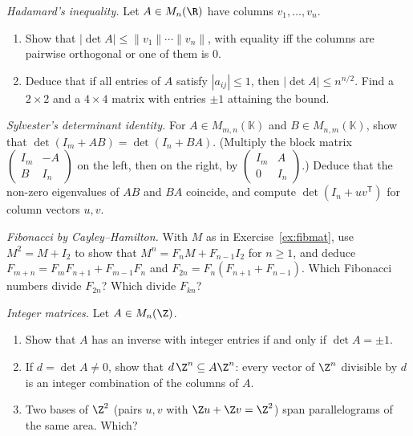 \begin{exercise}[$\star\star$]\label{ex:hadamard}
\emph{Hadamard's inequality.} Let $A\in M_n(\R)$ have columns $v_1,\dots,v_n$.
\begin{enumerate}[label=(\alph*)]
\item Show that $|\det A|\le\|v_1\|\cdots\|v_n\|$, with equality iff the columns are pairwise orthogonal or one of them is $0$.
\item Deduce that if all entries of $A$ satisfy $|a_{ij}|\le1$, then $|\det A|\le n^{n/2}$. Find a $2\times2$ and a $4\times4$ matrix with entries $\pm1$ attaining the bound.
\end{enumerate}
\end{exercise}

\begin{exercise}[$\star\star$]\label{ex:sylvester}
\emph{Sylvester's determinant identity.} For $A\in M_{m,n}(\mathbb K)$ and $B\in M_{n,m}(\mathbb K)$, show that $\det(I_m+AB)=\det(I_n+BA)$. (Multiply the block matrix $\begin{pmatrix}I_m&-A\\B&I_n\end{pmatrix}$ on the left, then on the right, by $\begin{pmatrix}I_m&A\\0&I_n\end{pmatrix}$.) Deduce that the non-zero eigenvalues of $AB$ and $BA$ coincide, and compute $\det(I_n+uv^{\mathsf T})$ for column vectors $u,v$.
\end{exercise}

\begin{exercise}[$\star$]\label{ex:fibch}
\emph{Fibonacci by Cayley--Hamilton.} With $M$ as in Exercise~\ref{ex:fibmat}, use $M^2=M+I_2$ to show that $M^n=F_nM+F_{n-1}I_2$ for $n\ge1$, and deduce $F_{m+n}=F_mF_{n+1}+F_{m-1}F_n$ and $F_{2n}=F_n(F_{n+1}+F_{n-1})$. Which Fibonacci numbers divide $F_{2n}$? Which divide $F_{kn}$?
\end{exercise}

\begin{exercise}[$\star\star$]\label{ex:intinverse}
\emph{Integer matrices.} Let $A\in M_n(\Z)$.
\begin{enumerate}[label=(\alph*)]
\item Show that $A$ has an inverse with integer entries if and only if $\det A=\pm1$.
\item If $d=\det A\ne0$, show that $d\,\Z^n\subseteq A\Z^n$: every vector of $\Z^n$ divisible by $d$ is an integer combination of the columns of $A$.
\item Two bases of $\Z^2$ (pairs $u,v$ with $\Z u+\Z v=\Z^2$) span parallelograms of the same area. Which?
\end{enumerate}
\end{exercise}

